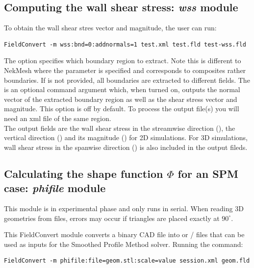\subsection{Computing the wall shear stress: \textit{wss} module}
To obtain the wall shear stres vector and magnitude, the user can run:
\begin{lstlisting}[style=BashInputStyle]
FieldConvert -m wss:bnd=0:addnormals=1 test.xml test.fld test-wss.fld
\end{lstlisting}
The option  specifies which boundary region to extract. Note this is
different to NekMesh where the parameter  is specified and corresponds
to composites rather boundaries. If  is not provided, all boundaries
are extracted to different fields. The  is an optional command
argument which, when turned on, outputs the normal vector of the extracted boundary
region as well as the shear stress vector and magnitude. This option is off by default.
To process the output file(s) you will need an xml file of the same region.\\
The output fields are the wall shear stress in the streamwise direction
(), the vertical direction () and its magnitude
() for 2D simulations. For 3D simulations, wall shear stress in
the spanwise direction () is also included in the output fileds.
%
%
%

\subsection{Calculating the shape function $\Phi$ for an SPM case:
\textit{phifile} module}
\label{s:utilities:fieldconvert:sub:phifile}

\begin{notebox}
    This module is in experimental phase and only runs in serial. When reading
    3D geometries from  files, errors may occur if triangles are
    placed exactly at $90^{\circ}$.
\end{notebox}

This FieldConvert module converts a binary  CAD file into
 or / files that can be used as inputs for
the Smoothed Profile Method solver. Running the command:

\begin{lstlisting}[style=BashInputStyle]
    FieldConvert -m phifile:file=geom.stl:scale=value session.xml geom.fld
\end{lstlisting}

